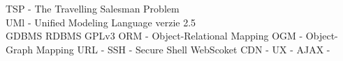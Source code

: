 TSP - The Travelling Salesman Problem\\
UMl - Unified Modeling Language verzie 2.5\\
GDBMS
RDBMS
GPLv3
ORM - Object-Relational Mapping
OGM - Object-Graph Mapping
URL - 
SSH - Secure Shell
WebScoket
CDN -
UX -
AJAX - 